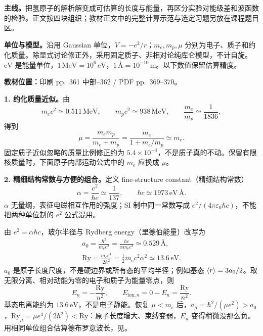 \textbf{主线。}把氢原子的解析解变成可估算的长度与能量，再区分实验对能级差和波函数的检验。正文按四块组织；教材正文中的完整计算示范与选定习题另放在课程题目区。

\textbf{单位与模型。}沿用 Gaussian 单位，$V=-e^2/r$；$m_e,m_p,\mu$ 分别为电子、质子和约化质量。除显式讨论修正外，采用固定质子、非相对论纯库仑模型，不计自旋。$\mathrm{eV}$ 是能量单位，$1\,\mathrm{MeV}=10^6\,\mathrm{eV}$，$1\,\text{\AA}=10^{-10}\,\mathrm m$。以下数值保留估算精度。

\textbf{教材位置：}印刷 pp.~361 中部--362 / PDF pp.~369--370。

\textbf{1. 约化质量近似。}由
\begin{equation}
  m_ec^2\simeq0.511\,\mathrm{MeV},\qquad
  m_pc^2\simeq938\,\mathrm{MeV},\qquad
  \frac{m_e}{m_p}\simeq\frac1{1836},
\end{equation}
得到
\begin{equation}
  \mu=\frac{m_em_p}{m_e+m_p}
     =\frac{m_e}{1+m_e/m_p}\simeq m_e.
\end{equation}
固定质子近似忽略的质量比例修正约为 $5.4\times10^{-4}$，不是质子真的不动。保留有限核质量时，下面原子内部运动公式中的 $m_e$ 应换成 $\mu$。

\textbf{2. 精细结构常数与方便的组合。}定义 fine-structure constant（精细结构常数）
\begin{equation}
  \boxed{\alpha=\frac{e^2}{\hbar c}\simeq\frac1{137},\qquad
  \hbar c\simeq1973\,\mathrm{eV}\,\text{\AA}.}
\end{equation}
$\alpha$ 无量纲，表征电磁相互作用的强度；SI 制中同一常数写成 $e^2/(4\pi\varepsilon_0\hbar c)$，不能把两种单位制的 $e^2$ 公式混用。

由 $e^2=\alpha\hbar c$，玻尔半径与 Rydberg energy（里德伯能量）改写为
\begin{align}
  \boxed{a_0=\frac{\hbar^2}{m_ee^2}
       =\frac{\hbar c}{\alpha m_ec^2}\simeq0.529\,\text{\AA},}\\
  \boxed{\mathrm{Ry}=\frac{m_ee^4}{2\hbar^2}
       =\frac12m_ec^2\alpha^2\simeq13.6\,\mathrm{eV}.}
\end{align}
$a_0$ 是原子长度尺度，不是硬边界或所有态的平均半径；例如基态 $\left\langle r \right\rangle=3a_0/2$。取无限分离、相对动能为零的电子和质子为能量零点，则
\begin{equation}
  E_n=-\frac{\mathrm{Ry}}{n^2},\qquad
  E_{\mathrm{ion},n}=0-E_n=\frac{\mathrm{Ry}}{n^2}.
\end{equation}
基态电离能约为 $13.6\,\mathrm{eV}$，不是电子静能。恢复 $\mu<m_e$ 后，$a_\mu=\hbar^2/(\mu e^2)>a_0$，$\mathrm{Ry}_\mu=\mu e^4/(2\hbar^2)<\mathrm{Ry}$：原子长度增大、束缚变弱，$E_n$ 变得稍微没那么负。用相同单位组合估算德布罗意波长，见。

